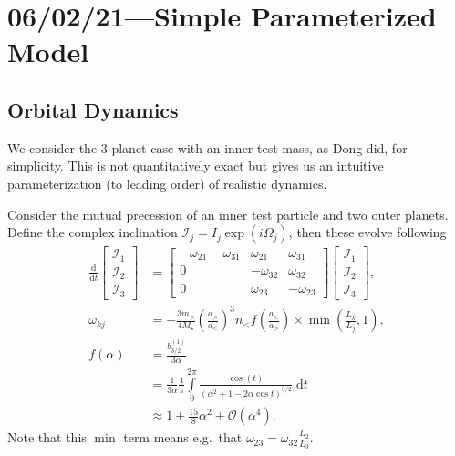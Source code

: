 \documentclass[11pt,
        usenames, %
        dvipsnames %
    ]{article}
\newcommand*{\rd}[2]{\frac{\mathrm{d}#1}{\mathrm{d}#2}}
\newcommand*{\p}[1]{\left(#1\right)}
\begin{document}
\tableofcontents

\section{06/02/21---Simple Parameterized Model}

\subsection{Orbital Dynamics}

We consider the 3-planet case with an inner test mass, as Dong did, for
simplicity. This is not quantitatively exact but gives us an intuitive
parameterization (to leading order) of realistic dynamics.

Consider the mutual precession of an inner test particle and two outer planets.
Define the complex inclination $\mathcal{I}_j = I_j\exp\p{i\Omega_j}$, then
these evolve following
\begin{align}
    \rd{}{t}\begin{bmatrix}
        \mathcal{I}_1\\
        \mathcal{I}_2\\
        \mathcal{I}_3
    \end{bmatrix} &=
        \begin{bmatrix}
            -\omega_{21} - \omega_{31} & \omega_{21} & \omega_{31}\\
            0 & -\omega_{32} & \omega_{32}\\
            0 & \omega_{23} & -\omega_{23}
        \end{bmatrix}
    \begin{bmatrix}
        \mathcal{I}_1\\
        \mathcal{I}_2\\
        \mathcal{I}_3
    \end{bmatrix},\label{eq:06/02/21.LL_matrix}\\
    \omega_{kj}
        &= -\frac{3 m_>}{4 M_\star}\p{\frac{a_>}{a_<}}^3 n_<
            f\p{\frac{a_<}{a_>}}
            \times \min\p{\frac{L_k}{L_j}, 1},\\
    f\p{\alpha} &= \frac{b_{3/2}^{(1)}}{3\alpha}\nonumber\\
        &= \frac{1}{3\alpha}
            \frac{1}{\pi}\int\limits_0^{2\pi}
                \frac{\cos \p{t}}{
                \p{\alpha^2 + 1 - 2\alpha \cos t}^{3/2}}\;\mathrm{d}t\nonumber\\
        &\approx 1 + \frac{15}{8}\alpha^2 + \mathcal{O}\p{\alpha^4}.
\end{align}
Note that this $\min$ term means e.g.\ that $\omega_{23} =
\omega_{32}\frac{L_2}{L_3}$.
\end{document}
